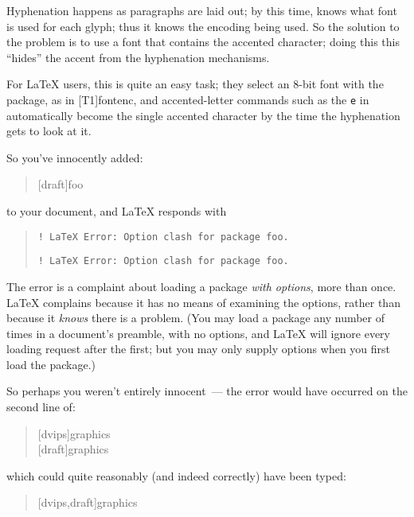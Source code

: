 Hyphenation happens as paragraphs are laid out; by this time, \tex{}
knows what font is used for each glyph; thus it knows the encoding
being used.  So the solution to the problem is to use a font that
contains the accented character; doing this this ``hides'' the accent
from the hyphenation mechanisms.

For \LaTeX{} users, this is quite an easy task; they select an 8-bit
font with the package, as in [T1]{fontenc}, and
accented-letter commands such as the \texttt{e} in
 automatically become the
single accented character by the time the hyphenation gets to look at
it.



So you've innocently added:
\begin{quote}
[draft]{foo}
\end{quote}
to your document, and \LaTeX{} responds with
\begin{quote}
\begin{wideversion}
\begin{verbatim}
! LaTeX Error: Option clash for package foo.
\end{verbatim}
\end{wideversion}
\begin{narrowversion}
\begin{verbatim}
! LaTeX Error: Option clash for package foo.
\end{verbatim}
\end{narrowversion}
\end{quote}

The error is a complaint about loading a package %
\emph{with options}, more than once.  \LaTeX{} complains because it
has no means of examining the options, rather than because it
\emph{knows} there is a problem.  (You may load a package any number
of times in a document's preamble, with no options, and \LaTeX{} will
ignore every loading request after the first; but you may only supply
options when you first load the package.)

So perhaps you weren't entirely innocent~--- the error would have
occurred on the second line of:
\begin{quote}
[dvips]{graphics}\\
[draft]{graphics}
\end{quote}
which could quite reasonably (and indeed correctly) have been typed:
\begin{quote}
[dvips,draft]{graphics}
\end{quote}


